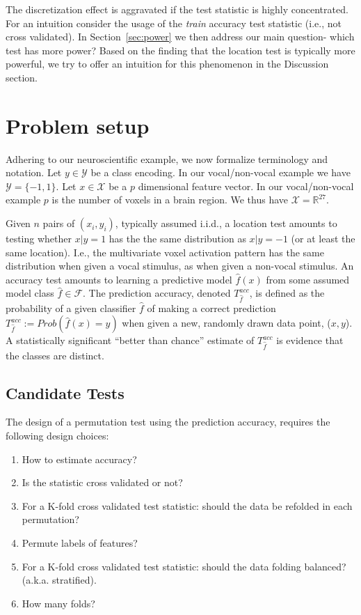\documentclass[12pt,a4paper]{article}
\newcommand{\set}[1]{\{ #1 \}} %
\newcommand{\reals}{\mathbb{R}} %
\newcommand{\features}{x} %
\newcommand{\outcomes}{y} %
\newcommand{\featureS}{\mathcal{X}} %
\newcommand{\outcomeS}{\mathcal{Y}} %
\newcommand{\hyp}{f} %
\newcommand{\hypEstim}{\hat{\hyp}} %
\newcommand{\hypclass}{\mathcal{F}}
\newcommand{\acc}{T^{acc}}
\newcommand{\prob}[1]{Prob( #1 )} %
\begin{document}
The discretization effect is aggravated if the test statistic is highly concentrated. 
For an intuition consider the usage of the \emph{train} accuracy test statistic (i.e., not cross validated).
In Section~\ref{sec:power} we then address our main question- which test has more power? 
Based on the finding that the location test is typically more powerful, we try to offer an intuition for this phenomenon in the Discussion section. 






\section{Problem setup}
\label{sec:problem_setup}

Adhering to our neuroscientific example, we now formalize terminology and notation. 
Let $\outcomes \in \outcomeS$ be a class encoding. In our vocal/non-vocal example we have $\outcomeS=\set{-1,1}$.
Let $\features \in \featureS$ be a $p$ dimensional feature vector. 
In our vocal/non-vocal example $p$ is the number of voxels in a brain region. We thus have $\featureS=\reals^{27}$. 

Given $n$ pairs of $(\features_i,\outcomes_i)$, typically assumed i.i.d., a location test amounts to testing whether $\features|\outcomes=1$ has the the same distribution as $\features|\outcomes=-1$ (or at least the same location). 
I.e., the multivariate voxel activation pattern has the same distribution when given a vocal stimulus, as when given a non-vocal stimulus. 
An accuracy test amounts to learning a predictive model $\hypEstim(\features)$ from some assumed model class $\hypEstim \in \hypclass$. 
The prediction accuracy, denoted $\acc_{\hypEstim}$, is defined as the probability of a given classifier $\hypEstim$ of making a correct prediction $\acc_{\hypEstim}:=\prob{\hypEstim(x)=y}$ when given a new, randomly drawn data point, ($\features,\outcomes$).
A statistically significant ``better than chance'' estimate of $\acc_{\hypEstim}$ is evidence that the classes are distinct. 


\subsection{Candidate Tests}
\label{sec:considerations}

The design of a permutation test using the prediction accuracy, requires the following design choices: 
\begin{enumerate}
\item How to estimate accuracy?
\item Is the statistic cross validated or not?
\item For a K-fold cross validated test statistic: should the data be refolded in each permutation? 
\item Permute labels of features?
\item For a K-fold cross validated test statistic: should the data folding balanced? (a.k.a. stratified).
\item How many folds? 
\end{enumerate}
\end{document}
